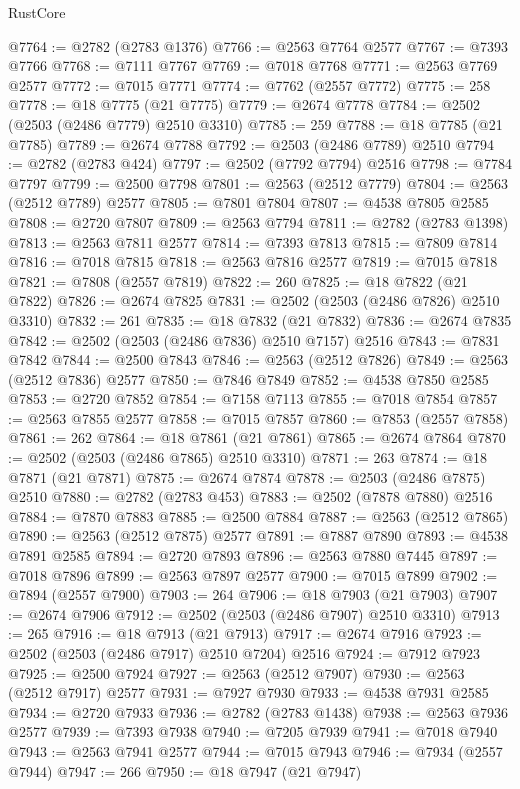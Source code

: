 \begin{lexlean}{RustCore}
\begin{coremodule}
@7764 := @2782 (@2783 @1376)
@7766 := @2563 @7764 @2577
@7767 := @7393 @7766
@7768 := @7111 @7767
@7769 := @7018 @7768
@7771 := @2563 @7769 @2577
@7772 := @7015 @7771
@7774 := @7762 (@2557 @7772)
@7775 := 258
@7778 := @18 @7775 (@21 @7775)
@7779 := @2674 @7778
@7784 := @2502 (@2503 (@2486 @7779) @2510 @3310)
@7785 := 259
@7788 := @18 @7785 (@21 @7785)
@7789 := @2674 @7788
@7792 := @2503 (@2486 @7789) @2510
@7794 := @2782 (@2783 @424)
@7797 := @2502 (@7792 @7794) @2516
@7798 := @7784 @7797
@7799 := @2500 @7798
@7801 := @2563 (@2512 @7779)
@7804 := @2563 (@2512 @7789) @2577
@7805 := @7801 @7804
@7807 := @4538 @7805 @2585
@7808 := @2720 @7807
@7809 := @2563 @7794
@7811 := @2782 (@2783 @1398)
@7813 := @2563 @7811 @2577
@7814 := @7393 @7813
@7815 := @7809 @7814
@7816 := @7018 @7815
@7818 := @2563 @7816 @2577
@7819 := @7015 @7818
@7821 := @7808 (@2557 @7819)
@7822 := 260
@7825 := @18 @7822 (@21 @7822)
@7826 := @2674 @7825
@7831 := @2502 (@2503 (@2486 @7826) @2510 @3310)
@7832 := 261
@7835 := @18 @7832 (@21 @7832)
@7836 := @2674 @7835
@7842 := @2502 (@2503 (@2486 @7836) @2510 @7157) @2516
@7843 := @7831 @7842
@7844 := @2500 @7843
@7846 := @2563 (@2512 @7826)
@7849 := @2563 (@2512 @7836) @2577
@7850 := @7846 @7849
@7852 := @4538 @7850 @2585
@7853 := @2720 @7852
@7854 := @7158 @7113
@7855 := @7018 @7854
@7857 := @2563 @7855 @2577
@7858 := @7015 @7857
@7860 := @7853 (@2557 @7858)
@7861 := 262
@7864 := @18 @7861 (@21 @7861)
@7865 := @2674 @7864
@7870 := @2502 (@2503 (@2486 @7865) @2510 @3310)
@7871 := 263
@7874 := @18 @7871 (@21 @7871)
@7875 := @2674 @7874
@7878 := @2503 (@2486 @7875) @2510
@7880 := @2782 (@2783 @453)
@7883 := @2502 (@7878 @7880) @2516
@7884 := @7870 @7883
@7885 := @2500 @7884
@7887 := @2563 (@2512 @7865)
@7890 := @2563 (@2512 @7875) @2577
@7891 := @7887 @7890
@7893 := @4538 @7891 @2585
@7894 := @2720 @7893
@7896 := @2563 @7880 @7445
@7897 := @7018 @7896
@7899 := @2563 @7897 @2577
@7900 := @7015 @7899
@7902 := @7894 (@2557 @7900)
@7903 := 264
@7906 := @18 @7903 (@21 @7903)
@7907 := @2674 @7906
@7912 := @2502 (@2503 (@2486 @7907) @2510 @3310)
@7913 := 265
@7916 := @18 @7913 (@21 @7913)
@7917 := @2674 @7916
@7923 := @2502 (@2503 (@2486 @7917) @2510 @7204) @2516
@7924 := @7912 @7923
@7925 := @2500 @7924
@7927 := @2563 (@2512 @7907)
@7930 := @2563 (@2512 @7917) @2577
@7931 := @7927 @7930
@7933 := @4538 @7931 @2585
@7934 := @2720 @7933
@7936 := @2782 (@2783 @1438)
@7938 := @2563 @7936 @2577
@7939 := @7393 @7938
@7940 := @7205 @7939
@7941 := @7018 @7940
@7943 := @2563 @7941 @2577
@7944 := @7015 @7943
@7946 := @7934 (@2557 @7944)
@7947 := 266
@7950 := @18 @7947 (@21 @7947)

\end{coremodule}
\end{lexlean}
